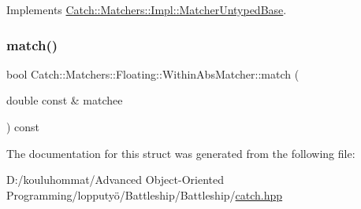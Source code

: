 Implements \mbox{\hyperlink{class_catch_1_1_matchers_1_1_impl_1_1_matcher_untyped_base_a91d3a907dbfcbb596077df24f6e11fe2}{Catch\+::\+Matchers\+::\+Impl\+::\+Matcher\+Untyped\+Base}}.

\mbox{\label{struct_catch_1_1_matchers_1_1_floating_1_1_within_abs_matcher_afa5d8eed57f12c1e5d006471eb0bfe72}} 
\subsubsection{\texorpdfstring{match()}{match()}}
{\footnotesize\ttfamily bool Catch\+::\+Matchers\+::\+Floating\+::\+Within\+Abs\+Matcher\+::match (\begin{DoxyParamCaption}\item[{double const \&}]{matchee }\end{DoxyParamCaption}) const\hspace{0.3cm}{\ttfamily [override]}}



The documentation for this struct was generated from the following file\+:\begin{DoxyCompactItemize}
\item 
D\+:/kouluhommat/\+Advanced Object-\/\+Oriented Programming/lopputyö/\+Battleship/\+Battleship/\mbox{\hyperlink{catch_8hpp}{catch.\+hpp}}\end{DoxyCompactItemize}
